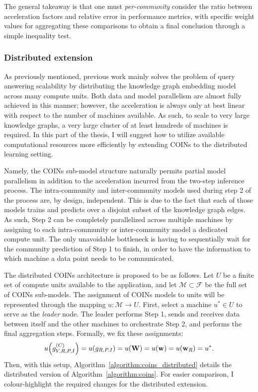 The general takeaway is that one must \emph{per-community} consider the ratio between acceleration factors and relative error in performance metrics, with specific weight values for aggregating these comparisons to obtain a final conclusion through a simple inequality test.


\subsubsection{Distributed extension}

As previously mentioned, previous work mainly solves the problem of query answering scalability by distributing the knowledge graph embedding model across many compute units. Both data and model parallelism are almost fully achieved in this manner; however, the acceleration is always only at best linear with respect to the number of machines available. As such, to scale to very large knowledge graphs, a very large cluster of at least hundreds of machines is required. In this part of the thesis, I will suggest how to utilize available computational resources more efficiently by extending COINs to the distributed learning setting.

Namely, the COINs sub-model structure naturally permits partial model parallelism in addition to the acceleration incurred from the two-step inference process. The intra-community and inter-community models used during step 2 of the process are, by design, independent. This is due to the fact that each of those models trains and predicts over a disjoint subset of the knowledge graph edges. As such, Step 2 can be completely parallelized across multiple machines by assigning to each intra-community or inter-community model a dedicated compute unit. The only unavoidable bottleneck is having to sequentially wait for the community prediction of Step 1 to finish, in order to have the information to which machine a data point needs to be communicated.

The distributed COINs architecture is proposed to be as follows. Let $U$ be a finite set of compute units available to the application, and let $\mathcal{M} \subset \mathcal{F}$ be the full set of COINs sub-models. The assignment of COINs models to units will be represented through the mapping $u: \mathcal{M} \to U$. First, select a machine $u^* \in U$ to serve as the \emph{leader} node. The leader performs Step 1, sends and receives data between itself and the other machines to orchestrate Step 2, and performs the final aggregation steps. Formally, we fix these assignments:
\begin{equation}
u\mathopen{}\left(g_{V,R,P,I}^{\mathopen{}\left(C\right)}\right)=u\mathopen{}\left(g_{R,P,I}\right)=u\mathopen{}\left(\mathbf{W}\right)=u\mathopen{}\left(\mathbf{w}\right)=u\mathopen{}\left(\mathbf{w}_R\right)=u^*.
\end{equation}
Then, with this setup, Algorithm~\ref{algorithm:coins_distributed} details the distributed version of Algorithm~\ref{algorithm:coins}. For easier comparison, I colour-highlight the required changes for the distributed extension.

